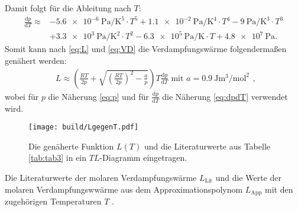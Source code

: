 Damit folgt für die Ableitung nach $T$:
\begin{equation}
\begin{aligned}
\frac{\text{d} p}{\text{d} T} \approx &- \SI{5.6e-6}{\pascal\per\kelvin\tothe{5}} \cdot T^5 + \SI{1.1e-2}{\pascal\per\kelvin\tothe{4}}\cdot T^4 - \SI{9}{\pascal\per\kelvin\tothe{3}} \cdot T^3 \\
&+ \SI{3.3e3}{\pascal\per\kelvin\tothe{2}} \cdot T^2 - \SI{6.3e5}{\pascal\per\kelvin} \cdot T + \SI{4.8e7}{\pascal}\text{.}
\end{aligned}\label{eq:dpdT}
\end{equation}
Somit kann nach \eqref{eq:L} und \eqref{eq:VD} die Verdampfungswärme folgendermaßen genähert werden:
\begin{displaymath}
	\begin{aligned}
		L \approx \left(\frac{R T}{2 p} + \sqrt{\left(\frac{R T}{2p}\right)^2-\frac{a}{p}}\right) T \frac{\text{d} p}{\text{d} T}\text{   mit }a=\SI{0.9}{\joule\meter\tothe{3}\per\mol\squared}
	\end{aligned}\text{,}
\end{displaymath}
wobei für $p$ die Näherung \eqref{eq:p} und für $\frac{\text{d} p}{\text{d} T}$ die Näherung \eqref{eq:dpdT} verwendet wird.
\begin{figure}
	\centering
	\caption{Die genäherte Funktion $L(T)$ und die Literaturwerte aus Tabelle \ref{tab:tab3} in ein $TL$-Diagramm eingetragen.}
	\texttt{[image: build/LgegenT.pdf]}
	\label{fig:Graph4}
\end{figure}
\begin{table}
	\caption{Die Literaturwerte der molaren Verdampfungswärme $L_\text{Lit}$  und die Werte der molaren Verdampfungswwärme aus dem Approximationspolynom $L_\text{App}$ mit den zugehörigen Temperaturen $T$ \cite{LWasser}.}
	\centering
	
\end{table}

